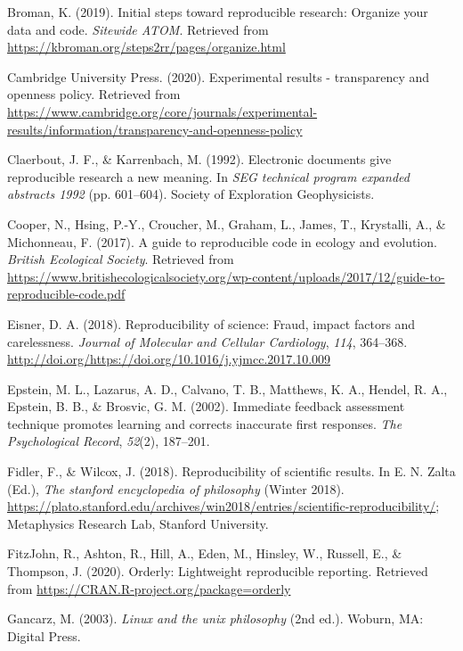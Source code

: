 \documentclass[12pt,twoside]{reedthesis}
\begin{document}
\hypertarget{ref-broman}{}
Broman, K. (2019). Initial steps toward reproducible research: Organize
your data and code. \emph{Sitewide ATOM}. Retrieved from
\url{https://kbroman.org/steps2rr/pages/organize.html}

\hypertarget{ref-exp-results}{}
Cambridge University Press. (2020). Experimental results - transparency
and openness policy. Retrieved from
\url{https://www.cambridge.org/core/journals/experimental-results/information/transparency-and-openness-policy}

\hypertarget{ref-claerbout}{}
Claerbout, J. F., \& Karrenbach, M. (1992). Electronic documents give
reproducible research a new meaning. In \emph{SEG technical program
expanded abstracts 1992} (pp. 601--604). Society of Exploration
Geophysicists.

\hypertarget{ref-cooper2017guide}{}
Cooper, N., Hsing, P.-Y., Croucher, M., Graham, L., James, T.,
Krystalli, A., \& Michonneau, F. (2017). A guide to reproducible code in
ecology and evolution. \emph{British Ecological Society}. Retrieved from
\url{https://www.britishecologicalsociety.org/wp-content/uploads/2017/12/guide-to-reproducible-code.pdf}

\hypertarget{ref-eisner-reproducibility}{}
Eisner, D. A. (2018). Reproducibility of science: Fraud, impact factors
and carelessness. \emph{Journal of Molecular and Cellular Cardiology},
\emph{114}, 364--368.
\url{http://doi.org/https://doi.org/10.1016/j.yjmcc.2017.10.009}

\hypertarget{ref-epstein2002immediate}{}
Epstein, M. L., Lazarus, A. D., Calvano, T. B., Matthews, K. A., Hendel,
R. A., Epstein, B. B., \& Brosvic, G. M. (2002). Immediate feedback
assessment technique promotes learning and corrects inaccurate first
responses. \emph{The Psychological Record}, \emph{52}(2), 187--201.

\hypertarget{ref-sep-scientific-reproducibility}{}
Fidler, F., \& Wilcox, J. (2018). Reproducibility of scientific results.
In E. N. Zalta (Ed.), \emph{The stanford encyclopedia of philosophy}
(Winter 2018).
\url{https://plato.stanford.edu/archives/win2018/entries/scientific-reproducibility/};
Metaphysics Research Lab, Stanford University.

\hypertarget{ref-R-orderly}{}
FitzJohn, R., Ashton, R., Hill, A., Eden, M., Hinsley, W., Russell, E.,
\& Thompson, J. (2020). Orderly: Lightweight reproducible reporting.
Retrieved from \url{https://CRAN.R-project.org/package=orderly}

\hypertarget{ref-unix}{}
Gancarz, M. (2003). \emph{Linux and the unix philosophy} (2nd ed.).
Woburn, MA: Digital Press.
\end{document}
